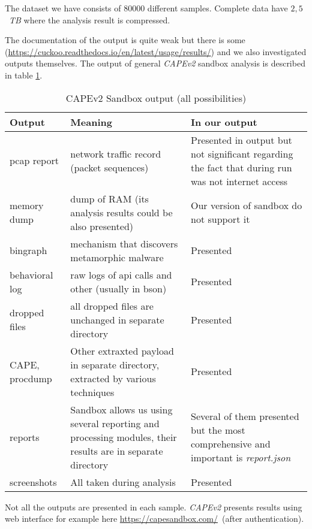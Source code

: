 The dataset we have consists of $80000$ different samples. Complete data have \texttildelow$2,5$~\emph{TB} where the analysis result is compressed.

The documentation of the output is quite weak but there is some (\url{https://cuckoo.readthedocs.io/en/latest/usage/results/}) and we also investigated outputs themselves. The output of general \emph{CAPEv2} sandbox analysis is described in table \ref{tab:sandbox-out}.

\begin{table}[h]
    \centering
    \caption{CAPEv2 Sandbox output (all possibilities)}
    \begin{tabular}{p{2cm}p{6cm}p{6cm}} 
        \toprule
        \textbf{Output} &
        \textbf{Meaning} &
        \textbf{In our output} \\
        \midrule
        pcap report & network traffic record (packet sequences) & Presented in output but not significant regarding the fact that during run was not internet access \\
        \midrule
        memory dump & dump of RAM (its analysis results could be also presented)& Our version of sandbox do not support it \\
        \midrule
        bingraph & mechanism that discovers metamorphic malware \cite{Kwon2012}& Presented\\
        \midrule
        behavioral log & raw logs of api calls and other (usually in bson) & Presented \\
        \midrule
        dropped files & all dropped files are unchanged in separate directory & Presented \\
        \midrule
        CAPE, procdump & Other extraxted payload in separate directory, extracted by various techniques \cite{Cape} & Presented \\
        \midrule
        reports & Sandbox allows us using several reporting and processing modules, their results are in separate directory  & Several of them presented but the most comprehensive and important is \emph{report.json} \\
        \midrule
        screenshots & All taken during analysis  & Presented \\
        \bottomrule
    \end{tabular}
    \label{tab:sandbox-out}
\end{table}

Not all the outputs are presented in each sample. \emph{CAPEv2} presents results using web interface for example here \url{https://capesandbox.com/}~(after authentication).

